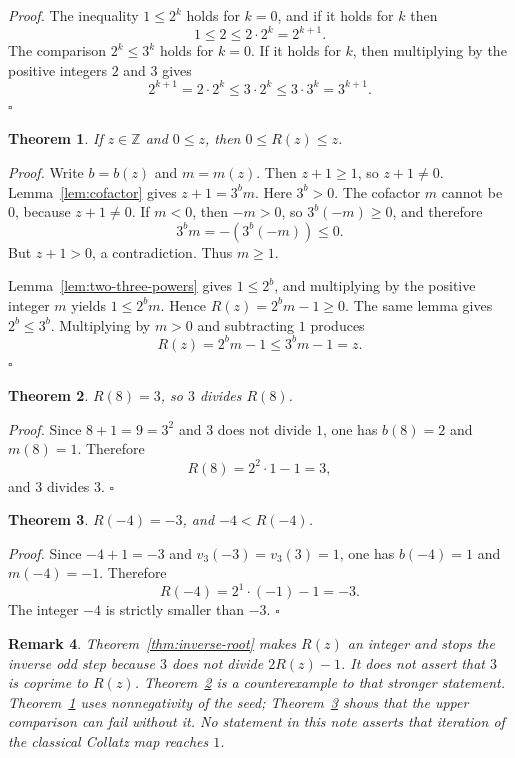 \documentclass[11pt,letterpaper]{article}
\newcommand{\Z}{\mathbb{Z}}
\newtheorem{theorem}{Theorem}
\newtheorem{remark}[theorem]{Remark}
\newenvironment{proof}{\noindent\textit{Proof.}}{\hfill\(\square\)}
\begin{document}
\begin{proof}
The inequality \(1\leq 2^k\) holds for \(k=0\), and if it holds for \(k\) then
\[
1\leq 2\leq 2\cdot 2^k=2^{k+1}.
\]
The comparison \(2^k\leq 3^k\) holds for \(k=0\). If it holds for \(k\), then multiplying by the positive integers \(2\) and \(3\) gives
\[
2^{k+1}=2\cdot 2^k\leq 3\cdot 2^k\leq 3\cdot 3^k=3^{k+1}.
\]
\end{proof}

\begin{theorem}
\label{thm:bounds}
If \(z\in\Z\) and \(0\leq z\), then \(0\leq R(z)\leq z\).
\end{theorem}

\begin{proof}
Write \(b=b(z)\) and \(m=m(z)\). Then \(z+1\geq 1\), so \(z+1\neq 0\). Lemma~\ref{lem:cofactor} gives \(z+1=3^bm\). Here \(3^b>0\). The cofactor \(m\) cannot be \(0\), because \(z+1\neq 0\). If \(m<0\), then \(-m>0\), so \(3^b(-m)\geq 0\), and therefore
\[
3^bm=-(3^b(-m))\leq 0.
\]
But \(z+1>0\), a contradiction. Thus \(m\geq 1\).

Lemma~\ref{lem:two-three-powers} gives \(1\leq 2^b\), and multiplying by the positive integer \(m\) yields \(1\leq 2^bm\). Hence \(R(z)=2^bm-1\geq 0\). The same lemma gives \(2^b\leq 3^b\). Multiplying by \(m>0\) and subtracting \(1\) produces
\[
R(z)=2^bm-1\leq 3^bm-1=z.
\]
\end{proof}

\begin{theorem}
\label{thm:eight}
\(R(8)=3\), so \(3\) divides \(R(8)\).
\end{theorem}

\begin{proof}
Since \(8+1=9=3^2\) and \(3\) does not divide \(1\), one has \(b(8)=2\) and \(m(8)=1\). Therefore
\[
R(8)=2^2\cdot 1-1=3,
\]
and \(3\) divides \(3\).
\end{proof}

\begin{theorem}
\label{thm:neg-four}
\(R(-4)=-3\), and \(-4<R(-4)\).
\end{theorem}

\begin{proof}
Since \(-4+1=-3\) and \(v_3(-3)=v_3(3)=1\), one has \(b(-4)=1\) and \(m(-4)=-1\). Therefore
\[
R(-4)=2^1\cdot(-1)-1=-3.
\]
The integer \(-4\) is strictly smaller than \(-3\).
\end{proof}

\begin{remark}
\label{rem:not-claimed}
Theorem~\ref{thm:inverse-root} makes \(R(z)\) an integer and stops the inverse odd step because \(3\) does not divide \(2R(z)-1\). It does not assert that \(3\) is coprime to \(R(z)\). Theorem~\ref{thm:eight} is a counterexample to that stronger statement. Theorem~\ref{thm:bounds} uses nonnegativity of the seed; Theorem~\ref{thm:neg-four} shows that the upper comparison can fail without it. No statement in this note asserts that iteration of the classical Collatz map reaches \(1\).
\end{remark}
\end{document}
